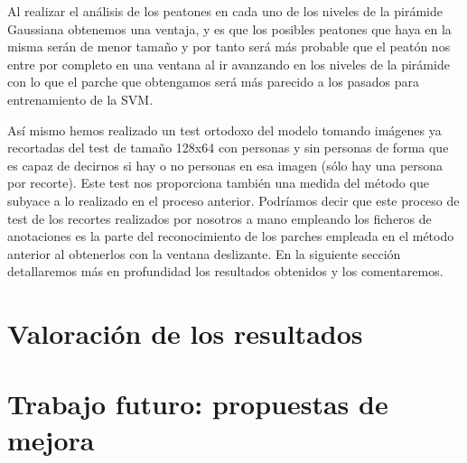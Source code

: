 \documentclass[a4paper,12pt]{article}
\begin{document}
Al realizar el análisis de los peatones en cada uno de los niveles de la pirámide Gaussiana obtenemos una ventaja, y es que los posibles peatones que haya en la misma serán de menor tamaño y por tanto será más probable que el peatón nos entre por completo en una ventana al ir avanzando en los niveles de la pirámide con lo que el parche que obtengamos será más parecido a los pasados para entrenamiento de la SVM. 

Así mismo hemos realizado un test ortodoxo del modelo tomando imágenes ya recortadas del test de tamaño 128x64 con personas y sin personas de forma que es capaz de decirnos si hay o no personas en esa imagen (sólo hay una persona por recorte). Este test nos proporciona también una medida del método que subyace a lo realizado en el proceso anterior. Podríamos decir que este proceso de test de los recortes realizados por nosotros a mano empleando los ficheros de anotaciones es la parte del reconocimiento de los parches empleada en el método anterior al obtenerlos con la ventana deslizante. En la siguiente sección detallaremos más en profundidad los resultados obtenidos y los comentaremos.


\section{Valoración de los resultados}


\section{Trabajo futuro: propuestas de mejora}

\normalsize


%
%
\end{document}
